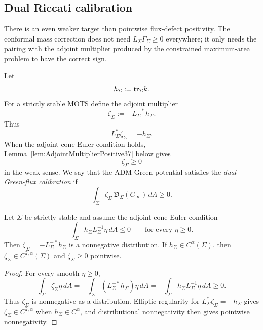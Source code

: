 \subsection{Dual Riccati calibration}
\label{subsec:DualRiccatiCalibration}

There is an even weaker target than pointwise flux-defect positivity. The conformal mass correction does not need \(L_\Sigma\Gamma_\Sigma\ge0\) everywhere; it only needs the pairing with the adjoint multiplier produced by the constrained maximum-area problem to have the correct sign.

\begin{definition}\label{def:AdjointMultiplier37}
Let
\[
    h_\Sigma:=\mathrm{tr}_\Sigma k .
\]
For a strictly stable MOTS define the adjoint multiplier
\[
    \zeta_\Sigma:=-L_\Sigma^{-*}h_\Sigma .
\]
Thus
\[
    L_\Sigma^*\zeta_\Sigma=-h_\Sigma .
\]
When the adjoint-cone Euler condition holds, Lemma~\ref{lem:AdjointMultiplierPositive37} below gives
\[
    \zeta_\Sigma\ge0
\]
in the weak sense. We say that the ADM Green potential satisfies the \emph{dual Green-flux calibration} if
\begin{equation}\label{eq:DualFluxCalibration37}
    \int_\Sigma \zeta_\Sigma\,\mathfrak D_\Sigma(G_\infty)\,dA\ge0 .
\end{equation}
\end{definition}

\begin{lemma}\label{lem:AdjointMultiplierPositive37}
Let \(\Sigma\) be strictly stable and assume the adjoint-cone Euler condition
\[
    \int_\Sigma h_\Sigma L_\Sigma^{-1}\eta\,dA\le0
    \qquad\text{for every }\eta\ge0 .
\]
Then \(\zeta_\Sigma=-L_\Sigma^{-*}h_\Sigma\) is a nonnegative distribution. If \(h_\Sigma\in C^\alpha(\Sigma)\), then \(\zeta_\Sigma\in C^{2,\alpha}(\Sigma)\) and \(\zeta_\Sigma\ge0\) pointwise.
\end{lemma}

\begin{proof}
For every smooth \(\eta\ge0\),
\[
    \int_\Sigma \zeta_\Sigma\eta\,dA
    =
    -\int_\Sigma (L_\Sigma^{-*}h_\Sigma)\eta\,dA
    =
    -\int_\Sigma h_\Sigma L_\Sigma^{-1}\eta\,dA
    \ge0 .
\]
Thus \(\zeta_\Sigma\) is nonnegative as a distribution. Elliptic regularity for \(L_\Sigma^*\zeta_\Sigma=-h_\Sigma\) gives \(\zeta_\Sigma\in C^{2,\alpha}\) when \(h_\Sigma\in C^\alpha\), and distributional nonnegativity then gives pointwise nonnegativity.
\end{proof}

